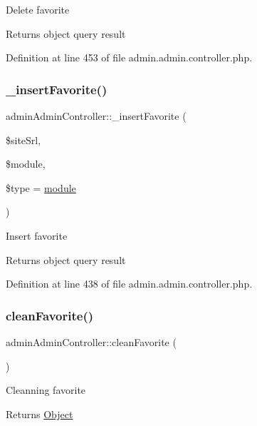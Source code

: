 Delete favorite \begin{DoxyReturn}{Returns}
object query result 
\end{DoxyReturn}


Definition at line 453 of file admin.\+admin.\+controller.\+php.

\hypertarget{classadminAdminController_ac8d650e27693beb7fc6814eb5e982f28}{}\label{classadminAdminController_ac8d650e27693beb7fc6814eb5e982f28} 
\subsubsection{\texorpdfstring{\+\_\+insert\+Favorite()}{\_insertFavorite()}}
{\footnotesize\ttfamily admin\+Admin\+Controller\+::\+\_\+insert\+Favorite (\begin{DoxyParamCaption}\item[{}]{\$site\+Srl,  }\item[{}]{\$module,  }\item[{}]{\$type = {\ttfamily \textquotesingle{}\hyperlink{classmodule}{module}\textquotesingle{}} }\end{DoxyParamCaption})}

Insert favorite \begin{DoxyReturn}{Returns}
object query result 
\end{DoxyReturn}


Definition at line 438 of file admin.\+admin.\+controller.\+php.

\hypertarget{classadminAdminController_a774b7d9260572f5d6391adc624e6b810}{}\label{classadminAdminController_a774b7d9260572f5d6391adc624e6b810} 
\subsubsection{\texorpdfstring{clean\+Favorite()}{cleanFavorite()}}
{\footnotesize\ttfamily admin\+Admin\+Controller\+::clean\+Favorite (\begin{DoxyParamCaption}{ }\end{DoxyParamCaption})}

Cleanning favorite \begin{DoxyReturn}{Returns}
\hyperlink{classObject}{Object} 
\end{DoxyReturn}


